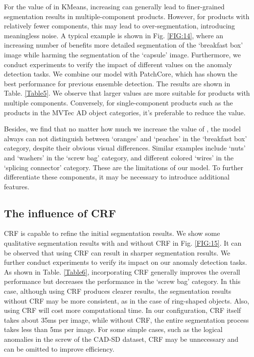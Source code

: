 \documentclass[final,5p,times,twocolumn]{elsarticle}
\begin{document}
For the value of  in KMeans, increasing  can generally lead to finer-grained segmentation results in multiple-component products. However, for products with relatively fewer components, this may lead to over-segmentation, introducing meaningless noise. A typical example is shown in Fig. \ref{FIG:14}, where an increasing number of  benefits more detailed segmentation of the `breakfast box' image while harming the segmentation of the `capsule' image. Furthermore, we conduct experiments to verify the impact of different  values on the anomaly detection tasks. We combine our model with PatchCore, which has shown the best performance for previous ensemble detection. The results are shown in Table. \ref{Table5}. We observe that larger  values are more suitable for products with multiple components. Conversely, for single-component products such as the products in the MVTec AD object categories, it's preferable to reduce the  value.  

Besides, we find that no matter how much we increase the value of , the model always can not distinguish between `oranges' and `peaches' in the `breakfast box' category, despite their obvious visual differences. Similar examples include `nuts' and `washers' in the `screw bag' category, and different colored `wires' in the `splicing connector' category. These are the limitations of our model. To further differentiate these components, it may be necessary to introduce additional features.  

\subsection{The influence of CRF}
\label{5.3}
CRF is capable to refine the initial segmentation results. We show some qualitative segmentation results with and without CRF in Fig. \ref{FIG:15}. It can be observed that using CRF can result in sharper segmentation results. We further conduct experiments to verify its impact on our anomaly detection tasks. As shown in Table. \ref{Table6}, incorporating CRF generally improves the overall performance but decreases the performance in the `screw bag' category. In this case, although using CRF produces clearer results, the segmentation results without CRF may be more consistent, as in the case of ring-shaped objects. Also, using CRF will cost more computational time. In our configuration, CRF itself takes about 35ms per image, while without CRF, the entire segmentation process takes less than 5ms per image. For some simple cases, such as the logical anomalies in the screw of the CAD-SD dataset, CRF may be unnecessary and can be omitted to improve efficiency.
\end{document}
